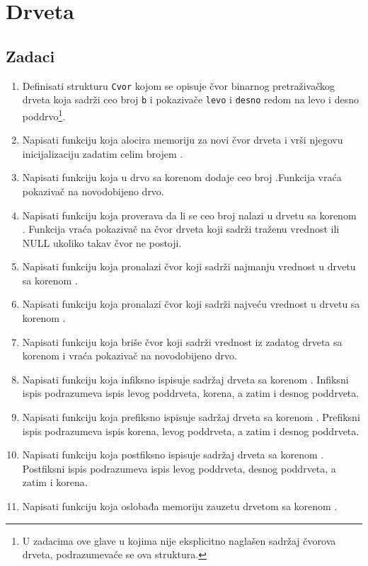 \chapter{Drveta}

\section{Zadaci}

\begin{Exercise}[label=701]
\begin{enumerate}
\item Definisati strukturu \verb|Cvor| kojom se opisuje čvor binarnog pretraživačkog drveta koja sadrži ceo broj \verb|b| i pokazivače \verb|levo| i \verb|desno| redom na levo i desno poddrvo\footnote{U zadacima ove glave u kojima nije eksplicitno naglašen sadržaj čvorova drveta, podrazumevaće se ova struktura.}.
\item Napisati funkciju  koja alocira memoriju za novi čvor drveta i vrši njegovu inicijalizaciju zadatim celim brojem .
\item Napisati funkciju  koja u drvo sa korenom  dodaje ceo broj .Funkcija vraća pokazivač na novodobijeno drvo.
\item Napisati funkciju  koja proverava da li se ceo broj  nalazi u drvetu sa korenom . Funkcija vraća pokazivač na čvor drveta koji sadrži traženu vrednost ili NULL ukoliko takav čvor ne postoji.
\item Napisati funkciju  koja pronalazi čvor koji sadrži najmanju vrednost u drvetu sa korenom .
\item Napisati funkciju  koja pronalazi čvor koji sadrži najveću vrednost u drvetu sa korenom .
\item Napisati funkciju  koja briše čvor koji sadrži vrednost  iz zadatog drveta sa korenom  i vraća pokazivač na novodobijeno drvo.    
\item Napisati funkciju  koja infiksno ispisuje sadržaj drveta sa korenom . Infiksni ispis podrazumeva ispis levog poddrveta, korena, a zatim i desnog poddrveta.
\item Napisati funkciju  koja prefiksno ispisuje sadržaj drveta sa korenom . Prefiksni ispis podrazumeva ispis korena, levog poddrveta, a zatim i desnog poddrveta.
\item Napisati funkciju  koja postfiksno ispisuje sadržaj drveta sa korenom . Postfiksni ispis podrazumeva ispis levog poddrveta, desnog poddrveta, a zatim i korena.
\item Napisati funkciju  koja oslobađa memoriju zauzetu drvetom sa korenom .
\end{enumerate}


\end{Exercise}
